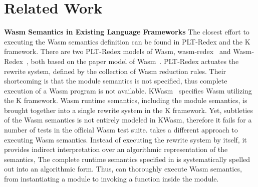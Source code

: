
\section{Related Work}
\label{sec:related}

\textbf{Wasm Semantics in Existing Language Frameworks}
The closest effort to executing the Wasm semantics definition can be found in PLT-Redex and the K framework.
There are two PLT-Redex models of Wasm, wasm-redex~\cite{wasm-redex-asumu} and Wasm-Redex~\cite{wasm-redex-adam},
both based on the paper model of Wasm~\cite{wasm-pldi17}.
PLT-Redex actuates the rewrite system, defined by the collection of Wasm reduction rules.
Their shortcoming is that the module semantics is not specified,
thus complete execution of a Wasm program is not available.
KWasm~\cite{wasm-k} specifies Wasm utilizing the K framework.
Wasm runtime semantics, including the module semantics, is brought together 
into a single rewrite system in the K framework.
Yet, subtleties of the Wasm semantics is not entirely modeled in KWasm,
therefore it fails for a number of tests in the official Wasm test suite.
\dslname takes a different approach to executing Wasm semantics.
Instead of executing the rewrite system by itself,
it provides indirect interpretation over an algorithmic representation of the semantics,
The complete runtime semantics specified in \dslname is 
systematically spelled out into an algorithmic form.
Thus, \dslname can thoroughly execute Wasm semantics,
from instantiating a module to invoking a function inside the module.
